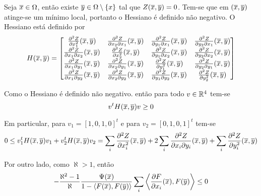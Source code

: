 \begin{demonstracao}
	Seja $\overline{x} \in \Omega$, então existe $\overline{y} \in \Omega \setminus \{x\}$ tal que $Z(\overline{x},\overline{y}) = 0$. Tem-se que em $(\overline{x},\overline{y})$ atinge-se um mínimo local, portanto o Hessiano é definido não negativo. O Hessiano está definido por
	\begin{equation*}
		H(\overline{x},\overline{y}) = \left[ \begin{matrix}
		\frac{\partial^2 Z}{\partial x_1^2}(\overline{x},\overline{y}) & \frac{\partial^2 Z}{\partial x_2 \partial x_1}(\overline{x},\overline{y}) & \frac{\partial^2 Z}{\partial y_1 \partial x_1}(\overline{x},\overline{y}) & \frac{\partial^2 Z}{\partial y_2 \partial x_1}(\overline{x},\overline{y})\\ 
		\frac{\partial^2 Z}{\partial x_1 \partial x_2}(\overline{x},\overline{y}) & \frac{\partial^2 Z}{\partial x_2^2}(\overline{x},\overline{y}) & \frac{\partial^2 Z}{\partial y_1 \partial x_2}(\overline{x},\overline{y}) & \frac{\partial^2 Z}{\partial y_2 \partial x_2}(\overline{x},\overline{y})\\
		 \frac{\partial^2 Z}{\partial x_1 \partial y_1}(\overline{x},\overline{y}) & \frac{\partial^2 Z}{\partial x_2 \partial y_1}(\overline{x},\overline{y}) & \frac{\partial^2 Z}{\partial y_1^2}(\overline{x},\overline{y}) & \frac{\partial^2 Z}{\partial y_2 \partial y_1}(\overline{x},\overline{y})\\
		  \frac{\partial^2 Z}{\partial x_1 \partial y_2}(\overline{x},\overline{y}) & \frac{\partial^2 Z}{\partial x_2 \partial y_2}(\overline{x},\overline{y}) & \frac{\partial^2 Z}{\partial y_1 \partial y_2}(\overline{x},\overline{y}) & \frac{\partial^2 Z}{\partial y_2^2}(\overline{x},\overline{y})
		\end{matrix} \right]
	\end{equation*}
	
	Como o Hessiano é definido não negativo. então para todo $v \in \mathbb{R}^4$ tem-se
	\begin{equation*}
		v^t H(\overline{x},\overline{y}) v \geq 0
	\end{equation*}
	
	Em particular, para $v_1 = [1,0,1,0]^t$ e para $v_2 = [0,1,0,1]^t$ tem-se
	\begin{equation*}
		0 \leq v_1^t H(\overline{x},\overline{y}) v_1 + v_2^t H(\overline{x},\overline{y}) v_ 2 = \sum_i \frac{\partial^2 Z}{\partial x_i^2}(\overline{x},\overline{y}) + 2 \sum_i \frac{\partial^2 Z}{\partial x_i \partial y_i}(\overline{x},\overline{y}) + \sum_i \frac{\partial^2 Z}{\partial y_i^2}(\overline{x},\overline{y})
	\end{equation*}
	
	Por outro lado, como $\aleph > 1$, então
	\begin{equation*}
		- \frac{\aleph^2 - 1}{\aleph} \frac{\Psi(\overline{x})}{1 - \langle F(\overline{x}), F(\overline{y}) \rangle} \sum_i \left\langle \frac{\partial F}{\partial x_i}(\overline{x}), F(\overline{y}) \right\rangle \leq 0
	\end{equation*}
	

\end{demonstracao}
